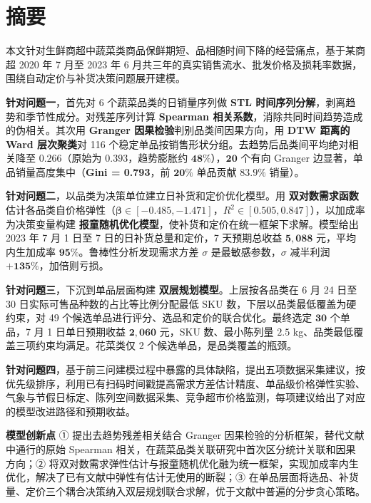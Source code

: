 \section*{摘要}

本文针对生鲜商超中蔬菜类商品保鲜期短、品相随时间下降的经营痛点，基于某商超 2020 年 7 月至 2023 年 6 月共三年的真实销售流水、批发价格及损耗率数据，围绕自动定价与补货决策问题展开建模。

\textbf{针对问题一}，首先对 6 个蔬菜品类的日销量序列做 \textbf{STL 时间序列分解}，剥离趋势和季节性成分。对残差序列计算 \textbf{Spearman 相关系数}，消除共同时间趋势造成的伪相关。其次用 \textbf{Granger 因果检验}判别品类间因果方向，用 \textbf{DTW 距离的 Ward 层次聚类}对 116 个稳定单品按销售形状分组。去趋势后品类间平均绝对相关降至 $\mathbf{0.266}$（原始为 $\mathbf{0.393}$，趋势膨胀约 $\mathbf{48\%}$），$\mathbf{20}$ 个有向 Granger 边显著，单品销量高度集中（\textbf{Gini = 0.793}，前 $\mathbf{20\%}$ 单品贡献 $\mathbf{83.9\%}$ 销量）。

\textbf{针对问题二}，以品类为决策单位建立日补货和定价优化模型。用 \textbf{双对数需求函数}估计各品类自价格弹性（$\mathbf{\beta \in [-0.485, -1.471]}$，$R^2 \in [0.505, 0.847]$），以加成率为决策变量构建 \textbf{报童随机优化模型}，使补货和定价在统一框架下求解。模型给出 2023 年 7 月 1 日至 7 日的日补货总量和定价，7 天预期总收益 $\mathbf{5,088}$ 元，平均内生加成率 $\mathbf{95\%}$。鲁棒性分析发现需求方差 $\sigma$ 是最敏感参数，$\sigma$ 减半利润 $\mathbf{+135\%}$，加倍则亏损。

\textbf{针对问题三}，下沉到单品层面构建 \textbf{双层规划模型}。上层按各品类在 6 月 24 日至 30 日实际可售品种数的占比等比例分配最低 SKU 数，下层以品类最低覆盖为硬约束，对 49 个候选单品进行评分、选品和定价的联合优化。最终选定 $\mathbf{30}$ 个单品，7 月 1 日单日预期收益 $\mathbf{2,060}$ 元，SKU 数、最小陈列量 $\mathbf{2.5}$ kg、品类最低覆盖三项约束均满足。花菜类仅 2 个候选单品，是品类覆盖的瓶颈。

\textbf{针对问题四}，基于前三问建模过程中暴露的具体缺陷，提出五项数据采集建议，按优先级排序，利用已有扫码时间戳提高需求方差估计精度、单品级价格弹性实验、气象与节假日标定、陈列空间数据采集、竞争超市价格监测，每项建议给出了对应的模型改进路径和预期收益。

\textbf{模型创新点} ① 提出去趋势残差相关结合 Granger 因果检验的分析框架，替代文献中通行的原始 Spearman 相关，在蔬菜品类关联研究中首次区分统计关联和因果方向；② 将双对数需求弹性估计与报童随机优化融为统一框架，实现加成率内生优化，解决了已有文献中弹性有估计无使用的断裂；③ 在单品层面将选品、补货量、定价三个耦合决策纳入双层规划联合求解，优于文献中普遍的分步贪心策略。

